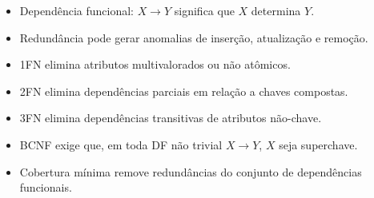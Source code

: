 \documentclass[12pt,a4paper]{article}
\begin{document}
\begin{itemize}
    \item Dependência funcional: $X \rightarrow Y$ significa que $X$ determina $Y$.
    \item Redundância pode gerar anomalias de inserção, atualização e remoção.
    \item 1FN elimina atributos multivalorados ou não atômicos.
    \item 2FN elimina dependências parciais em relação a chaves compostas.
    \item 3FN elimina dependências transitivas de atributos não-chave.
    \item BCNF exige que, em toda DF não trivial $X \rightarrow Y$, $X$ seja superchave.
    \item Cobertura mínima remove redundâncias do conjunto de dependências funcionais.
\end{itemize}
\end{document}
